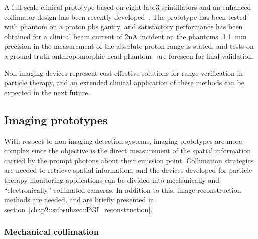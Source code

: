 A full-scale clinical prototype based on eight \gls{labr3} scintillators and an enhanced collimator design has been recently developed~\parencite{HuesoGonzalez2018}. The prototype has been tested with phantom on a proton \gls{pbs} gantry, and satisfactory performance has been obtained for a clinical beam current of 2nA incident on the phantoms. 1.1~mm precision in the measurement of the absolute proton range is stated, and tests on a ground-truth anthropomorphic head phantom~\parencite{Wohlfahrt2018} are foreseen for final validation.   

Non-imaging devices represent cost-effective solutions for range verification in particle therapy, and an extended clinical application of these methods can be expected in the next future. 

\subsection{Imaging prototypes}\label{chap2::subsec::PGdevices_Imaging}

With respect to non-imaging detection systems, imaging prototypes are more complex since the objective is the direct measurement of the spatial information carried by the prompt photons about their emission point. Collimation strategies are needed to retrieve spatial information, and the devices developed for particle therapy monitoring applications can be divided into mechanically and \enquote{electronically} collimated cameras. In addition to this, image reconstruction methods are needed, and are briefly presented in section~\ref{chap2::subsubsec::PGI_reconstruction}. 

\subsubsection{Mechanical collimation}\label{chap2::subsubsec::PGI_mechColl}

